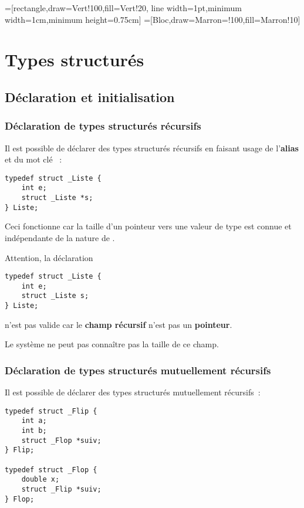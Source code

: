
=[rectangle,draw=Vert!100,fill=Vert!20,
    line width=1pt,minimum width=1cm,minimum height=0.75cm]
=[Bloc,draw=Marron=!100,fill=Marron!10]

\section{Types structurés}

\subsection{Déclaration et initialisation}

\begin{frame}[fragile]
\frametitle{Déclaration de types structurés récursifs}
Il est possible de \alert{déclarer des types structurés récursifs} en
faisant usage de l'{\bf alias} et du mot clé ~:
\medskip

\begin{lstlisting}
typedef struct _Liste {
    int e;
    struct _Liste *s;
} Liste;
\end{lstlisting}
\medskip

Ceci fonctionne car la taille d'un pointeur vers une valeur de type
 est connue et indépendante de la nature de .
\bigskip

Attention, la déclaration
\begin{lstlisting}
typedef struct _Liste {
    int e;
    struct _Liste s;
} Liste;
\end{lstlisting}
n'est pas valide car le {\bf champ récursif} n'est pas un {\bf pointeur}.
\medskip

Le système ne peut pas connaître pas la taille de ce champ.
\end{frame}

\begin{frame}[fragile]
\frametitle{Déclaration de types structurés mutuellement récursifs}
Il est possible de \alert{déclarer des types structurés mutuellement récursifs}~:
\begin{lstlisting}
typedef struct _Flip {
    int a;
    int b;
    struct _Flop *suiv;
} Flip;

typedef struct _Flop {
    double x;
    struct _Flip *suiv;
} Flop;
\end{lstlisting}

\begin{center}
\end{center}
\end{frame}


